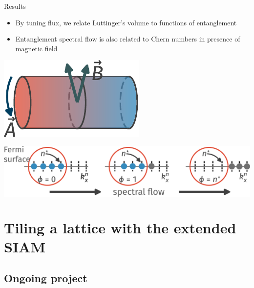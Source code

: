 \documentclass[aspectratio=169,t]{beamer}
\begin{document}
\begin{frame}{Results}
\begin{minipage}{0.63\textwidth}
\begin{itemize}
	\item By tuning flux, we relate Luttinger's volume to functions of entanglement
	\item Entanglement spectral flow is also related to Chern numbers in presence of magnetic field
\end{itemize}
\end{minipage}
\hspace*{\fill}
\begin{minipage}{0.35\textwidth}
\includegraphics[width=\textwidth]{cylinder.pdf}
\end{minipage}

\vspace*{\fill}
\includegraphics[width=\textwidth]{spectral-flow.pdf}
\end{frame}

\section{Tiling a lattice with the extended SIAM}
\subsection{Ongoing project}
\end{document}
